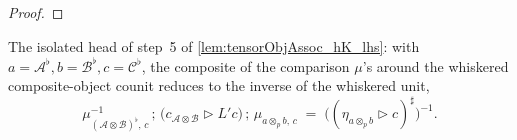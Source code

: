 \begin{proof}
\end{proof}

\begin{lemma}

  \label{lem:tensorObjAssoc_hK_lhs_head}
  The isolated head of step~5 of \cref{lem:tensorObjAssoc_hK_lhs}: with
  \(a=\mathcal{A}^{\flat}, b=\mathcal{B}^{\flat}, c=\mathcal{C}^{\flat}\), the composite of the
  comparison \(\mu\)'s around the whiskered composite-object counit reduces to the inverse of the
  whiskered unit,
  \[
    \mu_{(\mathcal{A}\otimes\mathcal{B})^{\flat},\,c}^{-1}\,;\,
      \bigl(c_{\mathcal{A}\otimes\mathcal{B}} \rhd L'c\bigr)\,;\,
      \mu_{a\otimes_p b,\,c}
    \;=\; \bigl((\eta_{a\otimes_p b} \rhd c)^{\sharp}\bigr)^{-1}.
  \]
\end{lemma}

